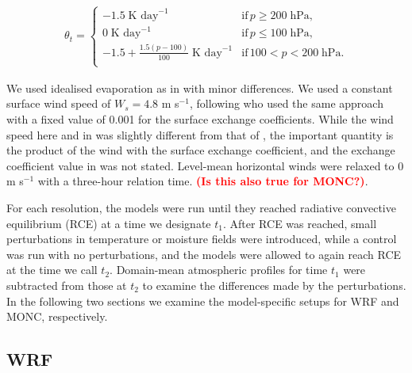 \documentclass[draft]{agujournal2019}
\newcommand{\todo}[1]{\textcolor{red}{\textbf{(#1)}}}
\begin{document}
\begin{align}
 \theta_t = \begin{cases}
    -1.5\; \textrm{K day}^{-1} & \textrm{if}\, p \geq 200\; \textrm{hPa}, \\
    0\; \textrm{K day}^{-1} & \textrm{if}\, p \leq 100\; \textrm{hPa}, \\
    -1.5 + \frac{1.5 (p-100)}{100}\; \textrm{K day}^{-1} & \textrm{if}\, 100 < p < 200\; \textrm{hPa}. \\
 \end{cases}
\end{align}

We used idealised evaporation as in  with minor
differences. We used a constant surface wind speed of $W_s = 4.8$ m s$^{-1}$,
following  who used the same approach with a fixed value
of 0.001 for the surface exchange coefficients. While the wind speed here and in
 was slightly different from that of
, the important quantity is the product of the wind with
the surface exchange coefficient, and the exchange coefficient value in
 was not stated. Level-mean horizontal winds were relaxed
to 0 m s$^{-1}$ with a three-hour relation time. \todo{Is this also true for
MONC?}.

For each resolution, the models were run until they reached radiative convective
equilibrium (RCE) at a time we designate $t_1$. After RCE was reached, small
perturbations in temperature or moisture fields were introduced, while a control
was run with no perturbations, and the models were allowed to again reach RCE at
the time we call $t_2$. Domain-mean atmospheric profiles for time $t_1$ were
subtracted from those at $t_2$ to examine the differences made by the
perturbations. In the following two sections we examine the model-specific
setups for WRF and MONC, respectively.

\subsection{WRF}
\end{document}
